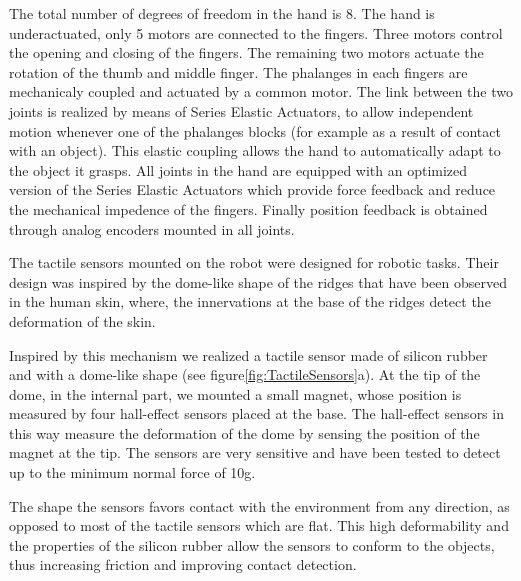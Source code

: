 
The total number of degrees of freedom in the hand is 8. The hand
is underactuated, only 5 motors are connected to the fingers. Three motors control
the opening and closing of the fingers. The remaining two motors actuate
the rotation of the thumb and middle finger. The phalanges in each fingers
are mechanicaly coupled and actuated by a common motor. The link between
the two joints is realized by means of Series
Elastic Actuators, to allow independent motion
whenever one of the phalanges blocks (for example as a result of contact
with an object). This elastic coupling allows the hand to automatically
adapt to the object it grasps. All joints in the hand are equipped with an
optimized version of the Series Elastic Actuators \cite{actuator} which provide
force feedback and reduce the mechanical impedence of the fingers. Finally
position feedback is obtained through analog encoders mounted in all joints.


The tactile sensors mounted on the robot were designed for robotic tasks.
Their design was inspired by the dome-like shape of the ridges that have been
observed in the human skin, where, the innervations at the base of the ridges
detect the deformation of the skin.

Inspired by this mechanism we realized a tactile sensor made of
silicon rubber and with a dome-like shape (see
figure\ref{fig:TactileSensors}a). At the tip of the dome, in the
internal part, we mounted a small magnet, whose position is
measured by four hall-effect sensors placed at the base. The
hall-effect sensors in this way measure the deformation of the
dome by sensing the position of the magnet at the tip. The sensors
are very sensitive and have been tested to detect up to the
minimum normal force of 10g.

The shape the sensors favors contact with the environment from any direction,
as opposed to most of the tactile sensors which are flat.
This high deformability and the properties of the silicon rubber allow the
sensors to conform to the objects, thus increasing friction and improving
contact detection.

